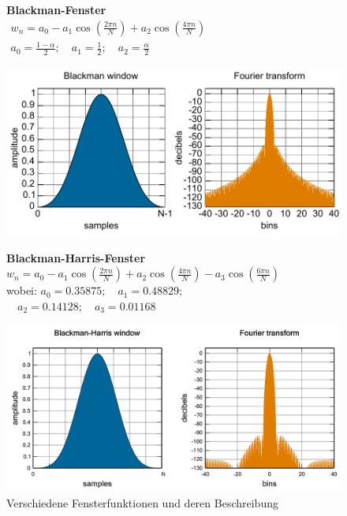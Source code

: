\begin{figure}
	\begin{minipage}{.4\columnwidth}
		\textbf{Blackman-Fenster}\\
		$\begin{array}{l}{w_{n}=a_{0}-a_{1} \cos \left(\frac{2 \pi n}{N}\right)+a_{2} \cos \left(\frac{4 \pi n}{N}\right)} \\ 		{a_{0}=\frac{1-\alpha}{2} ; \quad a_{1}=\frac{1}{2} ; \quad a_{2}=\frac{\alpha}{2}}\end{array}$
	\end{minipage}%
	\begin{minipage}{.6\columnwidth}
		\centering
		\includegraphics[width=\linewidth]{papers/autotune/sections/fft/images/windows/Blackman.pdf}
	\end{minipage}


	\begin{minipage}{.4\columnwidth}
		\textbf{Blackman-Harris-Fenster}\\
		$w_{n}=a_{0}-a_{1} \cos \left(\frac{2 \pi n}{N}\right)+a_{2} \cos \left(\frac{4 \pi n}{N}\right)-a_{3} \cos \left(\frac{6 \pi n}{N}\right)$\\
		wobei:
		$a_{0}=0.35875 ; \quad a_{1}=0.48829 ;$\\
		$ \quad a_{2}=0.14128 ; \quad a_{3}=0.01168$
	\end{minipage}%
	\begin{minipage}{.6\columnwidth}
		\centering
		\includegraphics[width=\linewidth]{papers/autotune/sections/fft/images/windows/Blackman-Harris.pdf}
	\end{minipage}

\caption{Verschiedene Fensterfunktionen und deren Beschreibung \cite{wikipedia:Window}}
\label{fig:STFTtab}
\end{figure}


